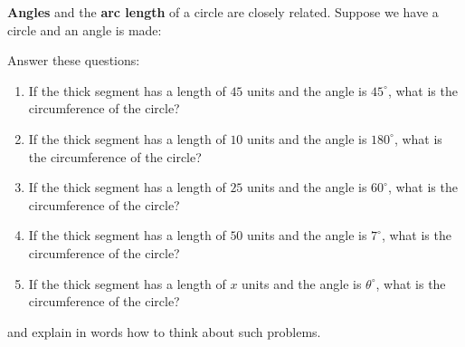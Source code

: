 \documentclass[noauthor,hints,nooutcomes,handout]{ximera}
\begin{document}
\begin{question}
\textbf{Angles} and the \textbf{arc length} of a circle are closely
related. Suppose we have a circle and an angle is made:

\begin{center}
 
\end{center}
Answer these questions:
\begin{enumerate}
\item If the thick segment has a length of $45$ units and the angle is $45^\circ$, what is the circumference of the circle?
\item If the thick segment has a length of $10$ units and the angle is $180^\circ$, what is the circumference of the circle?
\item If the thick segment has a length of $25$ units and the angle is $60^\circ$, what is the circumference of the circle?
\item If the thick segment has a length of $50$ units and the angle is $7^\circ$, what is the circumference of the circle?
\item If the thick segment has a length of $x$ units and the angle is $\theta^\circ$, what is the circumference of the circle?
\end{enumerate}
and explain in words how to think about such problems.
\end{question}
\mynewpage
\end{document}
